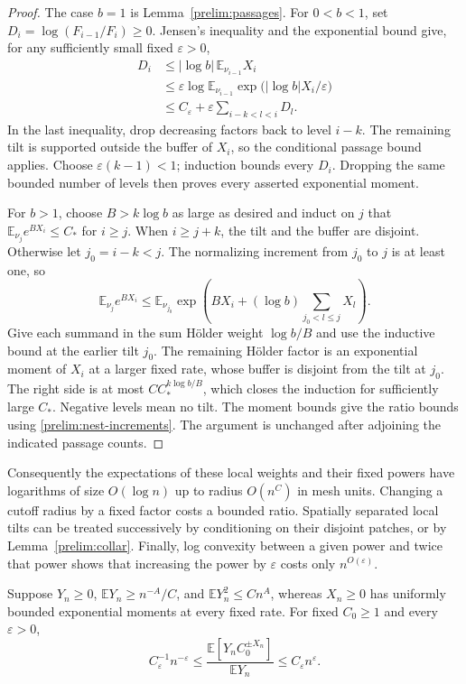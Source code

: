 \begin{proof}
The case $b=1$ is Lemma~\ref{prelim:passages}. For $0<b<1$, set
$D_i=\log(F_{i-1}/F_i)\ge0$. Jensen's inequality and the exponential
bound give, for any sufficiently small fixed $\varepsilon>0$,
\begin{align*}
 D_i
 &\le |\log b|\,\mathbb E_{\nu_{i-1}}X_i\\
 &\le\varepsilon\log
       \mathbb E_{\nu_{i-1}}
          \exp\bigl(|\log b|X_i/\varepsilon\bigr)\\
 &\le C_\varepsilon+
       \varepsilon\sum_{i-k<l<i}D_l.
\end{align*}
In the last inequality, drop decreasing factors back to level $i-k$.
The remaining tilt is supported outside the buffer of $X_i$, so the
conditional passage bound applies. Choose $\varepsilon(k-1)<1$;
induction bounds every $D_i$. Dropping the same bounded number of levels
then proves every asserted exponential moment.

For $b>1$, choose $B>k\log b$ as large as desired and induct on $j$ that
$\mathbb E_{\nu_j}e^{BX_i}\le C_*$ for $i\ge j$. When $i\ge j+k$,
the tilt and the buffer are disjoint. Otherwise let $j_0=i-k<j$.
The normalizing increment from $j_0$ to $j$ is at least one, so
\[
 \mathbb E_{\nu_j}e^{BX_i}
 \le\mathbb E_{\nu_{j_0}}
 \exp\left(BX_i+(\log b)\sum_{j_0<l\le j}X_l\right).
\]
Give each summand in the sum H\"older weight $\log b/B$ and use the
inductive bound at the earlier tilt $j_0$. The remaining H\"older
factor is an exponential moment of $X_i$ at a larger fixed rate,
whose buffer is disjoint from the tilt at $j_0$. The right side is at
most $C C_*^{k\log b/B}$, which closes the induction for sufficiently
large $C_*$. Negative levels mean no tilt. The moment bounds give the
ratio bounds using \eqref{prelim:nest-increments}. The argument is
unchanged after adjoining the indicated passage counts.
\end{proof}

Consequently the expectations of these local weights and their fixed
powers have logarithms of size $O(\log n)$ up to radius $O(n^C)$ in mesh
units. Changing a cutoff
radius by a fixed factor costs a bounded ratio. Spatially separated local
tilts can be treated successively by conditioning on their disjoint
patches, or by Lemma~\ref{prelim:collar}. Finally, log convexity between
a given power and twice that power shows that increasing the power by
$\varepsilon$ costs only $n^{O(\varepsilon)}$.

\begin{lemma}\label{prelim:absorb}
Suppose $Y_n\ge0$, $\mathbb E Y_n\ge n^{-A}/C$, and
$\mathbb E Y_n^2\le Cn^A$, whereas $X_n\ge0$ has uniformly bounded
exponential moments at every fixed rate. For fixed $C_0\ge1$ and every
$\varepsilon>0$,
\[
 C_\varepsilon^{-1}n^{-\varepsilon}
 \le
 \frac{\mathbb E[Y_n C_0^{\pm X_n}]}{\mathbb E Y_n}
 \le C_\varepsilon n^{\varepsilon}.
\]
\end{lemma}

